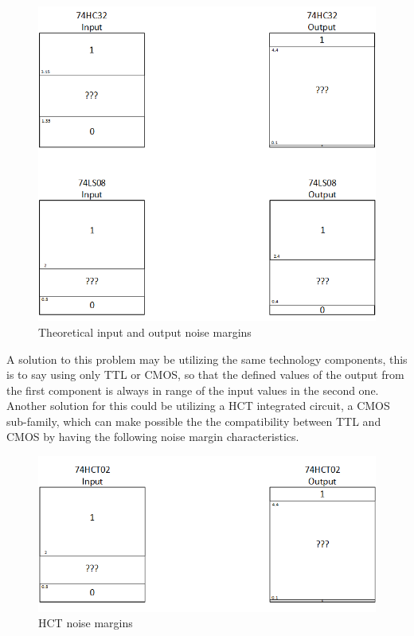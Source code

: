 \begin{figure}[h!]
        \centering
        \includegraphics[scale=0.45]{./Graficos5.png}
        \caption{\color{cyan}Theoretical input and output noise margins}
        \label{fig:ej5noisemargin}
\end{figure}

A solution to this problem may be utilizing the same technology components, this is to say using only TTL or CMOS, so that the defined values of the output from the first component is always in range of the input values in the second one. Another solution for this could be utilizing a HCT integrated circuit, a CMOS sub-family, which can make possible the the compatibility between TTL and CMOS by having the following noise margin characteristics. 

\begin{figure}[h!]
        \centering
        \includegraphics[scale=0.45]{./dataaa5.png}
        \caption{\color{cyan}HCT noise margins}
        \label{fig:ej5noisemargin}
\end{figure}


